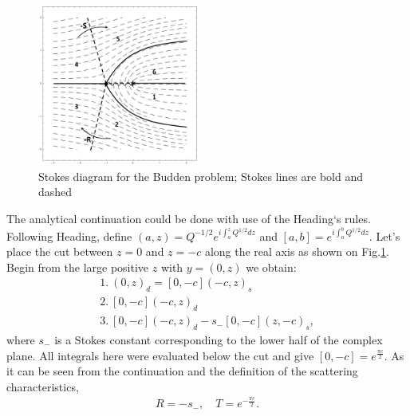 \documentclass[aip,jmp,reprint]{revtex4-1}
\def\mytextwidth{0.47\textwidth}
\begin{document}
\begin{figure}
\centering
\noindent
\includegraphics[width=\mytextwidth]{stuff/diagram.jpg}
\caption{Stokes diagram for the Budden problem; Stokes lines are bold and dashed}
\label{fig:diagram}
\end{figure} 

The analytical continuation could be done with use of the Heading`s rules. 
Following Heading\cite{heading}, define $(a,z) = Q^{-1/2}e^{i\int_a^z Q^{1/2} dz}$ 
and $[a,b] = e^{i\int_a^b Q^{1/2} dz}$. Let's place the cut between $z=0$ and $z=-c$ 
along the real axis as shown on Fig.\ref{fig:diagram}. Begin from the large positive $z$ 
with $y=(0,z)$ we obtain:
\begin{eqnarray}
1.\ (0,z)_d=[0,-c](-c,z)_s \nonumber\\
2.\ [0,-c](-c,z)_d \nonumber\\
3.\ [0,-c](-c,z)_d - s_-[0,-c](z,-c)_s \nonumber,
\end{eqnarray}
where $s_-$ is a Stokes constant corresponding to the lower half of the complex plane. 
All integrals here were evaluated below the cut and give $[0,-c]=e^{\frac{\pi c}{2}}$. As it
can be seen from the continuation and the definition of the scattering characteristics,
\begin{eqnarray}
R = -s_-, \quad T = e^{-\frac{\pi c}{2}}.
\label{eq:scattr}
\end{eqnarray}
\end{document}
